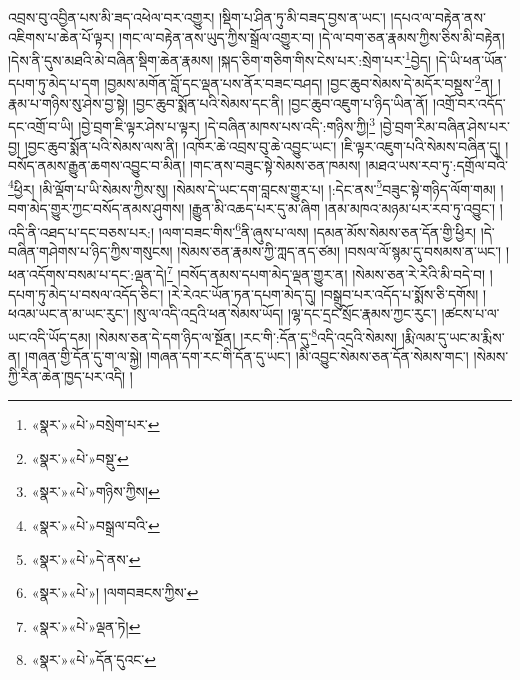 འབྲས་བུ་འབྱིན་པས་མི་ཟད་འཕེལ་བར་འགྱུར། །སྡིག་པ་ཤིན་ཏུ་མི་བཟད་བྱས་ན་ཡང་། །དཔའ་ལ་བརྟེན་ནས་འཇིགས་པ་ཆེན་པོ་ལྟར། །གང་ལ་བརྟེན་ནས་ཡུད་ཀྱིས་སྒྲོལ་འགྱུར་བ། །དེ་ལ་བག་ཅན་རྣམས་ཀྱིས་ཅིས་མི་བརྟེན། །དེས་ནི་དུས་མཐའི་མེ་བཞིན་སྡིག་ཆེན་རྣམས། །སྐད་ཅིག་གཅིག་གིས་ངེས་པར་:སྲེག་པར་\footnote{«སྣར་»«པེ་»བསྲེག་པར་}བྱེད། །དེ་ཡི་ཕན་ཡོན་དཔག་ཏུ་མེད་པ་དག །བྱམས་མགོན་བློ་དང་ལྡན་པས་ནོར་བཟང་བཤད། །བྱང་ཆུབ་སེམས་དེ་མདོར་བསྡུས་\footnote{«སྣར་»«པེ་»བསྡུ་}ན། །རྣམ་པ་གཉིས་སུ་ཤེས་བྱ་སྟེ། །བྱང་ཆུབ་སྨོན་པའི་སེམས་དང་ནི། །བྱང་ཆུབ་འཇུག་པ་ཉིད་ཡིན་ནོ། །འགྲོ་བར་འདོད་དང་འགྲོ་བ་ཡི། །བྱེ་བྲག་ཇི་ལྟར་ཤེས་པ་ལྟར། །དེ་བཞིན་མཁས་པས་འདི་:གཉིས་ཀྱི།\footnote{«སྣར་»«པེ་»གཉིས་ཀྱིས།} །བྱེ་བྲག་རིམ་བཞིན་ཤེས་པར་བྱ། །བྱང་ཆུབ་སྨོན་པའི་སེམས་ལས་ནི། །འཁོར་ཆེ་འབྲས་བུ་ཆེ་འབྱུང་ཡང་། །ཇི་ལྟར་འཇུག་པའི་སེམས་བཞིན་དུ། །བསོད་ནམས་རྒྱུན་ཆགས་འབྱུང་བ་མིན། །གང་ནས་བཟུང་སྟེ་སེམས་ཅན་ཁམས། །མཐའ་ཡས་རབ་ཏུ་:དགྲོལ་བའི་\footnote{«སྣར་»«པེ་»བསྒྲལ་བའི་}ཕྱིར། །མི་ལྡོག་པ་ཡི་སེམས་ཀྱིས་སུ། །སེམས་དེ་ཡང་དག་བླངས་གྱུར་པ། །:དེང་ནས་\footnote{«སྣར་»«པེ་»དེ་ནས་}བཟུང་སྟེ་གཉིད་ལོག་གམ། །བག་མེད་གྱུར་ཀྱང་བསོད་ནམས་ཤུགས། །རྒྱུན་མི་འཆད་པར་དུ་མ་ཞིག །ནམ་མཁའ་མཉམ་པར་རབ་ཏུ་འབྱུང་། །འདི་ནི་འཐད་པ་དང་བཅས་པར:། །ལག་བཟང་གིས་\footnote{«སྣར་»«པེ་»། །ལགབཟངས་ཀྱིས་}ནི་ཞུས་པ་ལས། །དམན་མོས་སེམས་ཅན་དོན་གྱི་ཕྱིར། །དེ་བཞིན་གཤེགས་པ་ཉིད་ཀྱིས་གསུངས། །སེམས་ཅན་རྣམས་ཀྱི་ཀླད་ནད་ཙམ། །བསལ་ལོ་སྙམ་དུ་བསམས་ན་ཡང་། །ཕན་འདོགས་བསམ་པ་དང་:ལྡན་དེ།\footnote{«སྣར་»«པེ་»ལྡན་ཏེ།} །བསོད་ནམས་དཔག་མེད་ལྡན་གྱུར་ན། །སེམས་ཅན་རེ་རེའི་མི་བདེ་བ། །དཔག་ཏུ་མེད་པ་བསལ་འདོད་ཅིང་། །རེ་རེའང་ཡོན་ཏན་དཔག་མེད་དུ། །བསྒྲུབ་པར་འདོད་པ་སྨོས་ཅི་དགོས། །ཕའམ་ཡང་ན་མ་ཡང་རུང་། །སུ་ལ་འདི་འདྲའི་ཕན་སེམས་ཡོད། །ལྷ་དང་དྲང་སྲོང་རྣམས་ཀྱང་རུང་། །ཚངས་པ་ལ་ཡང་འདི་ཡོད་དམ། །སེམས་ཅན་དེ་དག་ཉིད་ལ་སྔོན། །རང་གི་:དོན་དུ་\footnote{«སྣར་»«པེ་»དོན་དུའང་}འདི་འདྲའི་སེམས། །རྨི་ལམ་དུ་ཡང་མ་རྨིས་ན། །གཞན་གྱི་དོན་དུ་ག་ལ་སྐྱེ། །གཞན་དག་རང་གི་དོན་དུ་ཡང་། །མི་འབྱུང་སེམས་ཅན་དོན་སེམས་གང་། །སེམས་ཀྱི་རིན་ཆེན་ཁྱད་པར་འདི། །
